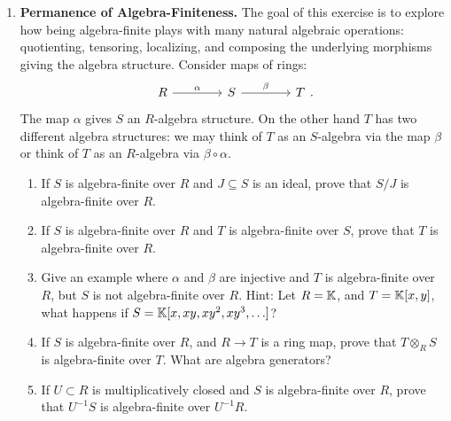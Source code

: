 \documentclass[12pt,reqno]{amsart}
\begin{document}
\begin{enumerate}[leftmargin=*, resume=problems]
\item \textbf{Permanence of Algebra-Finiteness.} The goal of this exercise is to explore how being algebra-finite plays with many natural algebraic operations: quotienting, tensoring, localizing, and composing the underlying morphisms giving the algebra structure. Consider maps of rings:
\[
\begin{tikzcd}[row sep = .3em, column sep = 4em]
R \arrow[r, "\alpha"] & S \arrow[r, "\beta"] & T
\end{tikzcd}.
\]
The map $\alpha$ gives $S$ an $R$-algebra structure. On the other hand $T$ has two different algebra structures: we may think of $T$ as an $S$-algebra via the map $\beta$ or think of $T$ as an $R$-algebra via $\beta\circ\alpha$. 
\begin{enumerate}
    \item If $S$ is algebra-finite over $R$ and $J\subseteq S$ is an ideal, prove that $S/J$ is algebra-finite over $R$.
    \item If $S$ is algebra-finite over $R$ and $T$ is algebra-finite over $S$, prove that $T$ is algebra-finite over $R$.
    \item Give an example where $\alpha$ and $\beta$ are injective and $T$ is algebra-finite over $R$, but $S$ is not algebra-finite over $R$. Hint: Let $R=\mathbb{K}$, and $T = \mathbb{K}[x,y]$, what happens if $S=\mathbb{K}[x,xy,xy^{2},xy^{3},\ldots]$?
    \item If $S$ is algebra-finite over $R$, and $R\to T$ is a ring map, prove that $T\otimes_R S$ is algebra-finite over $T$. What are algebra generators?
    \item If $U\subset R$ is multiplicatively closed and $S$ is algebra-finite over $R$, prove that $U^{-1}S$ is algebra-finite over $U^{-1}R$.
\end{enumerate}


\end{enumerate}
\end{document}
